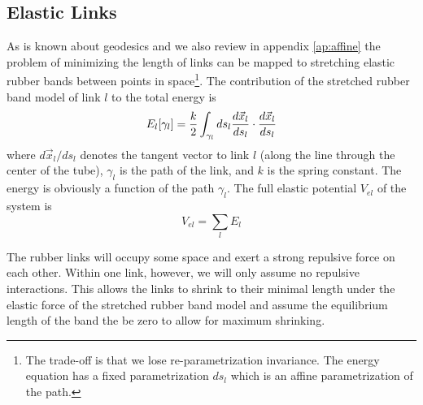 \documentclass[nofootinbib,preprint,floatfix,titlepage,superscriptaddress]{revtex4} %
\newcommand{\outNim}[1]{}
\begin{document}
\outNim{
\subsection{Other links}

We will implement the curved-space rubber-band similar to flat space. The repulsive force from other links is a function of their geodesic distance, but that is hard to calculate in curved space. Since we assume the force to be short-ranged, we will use a constant metric, based on the midpoint between the two points to calculate the distance between the two points and won't use accurate geodesic distance. 

Also, we will add this repulsive force directly as a force on the l.h.s. of the geodesic equation and won't try to incorporate it into the metric and derive perturbed Christoffel symbols. 
Thus we will only need to define a global metric function.  

}


\subsection{Elastic Links}
As is known about geodesics \citep{novikov1984} and we also review in appendix \ref{ap:affine} the problem of minimizing the length of links can be mapped to stretching elastic rubber bands between points in space\footnote{The trade-off is that we lose re-parametrization invariance. The energy equation has a fixed parametrization $ds_l$ which is an affine parametrization of the path.}. The contribution of the stretched rubber band model of link $l$ to the total energy is
\begin{equation}
  E_l[\gamma_l] = {k\over 2}\int_{\gamma_l} ds_l {d\vec{x}_l\over ds_l} \cdot {d\vec{x}_l\over ds_l} \label{eq:El}
\end{equation}
where $d\vec{x}_l/ds_l$ denotes the tangent vector to link $l$ (along the line through the center of the tube), $\gamma_l$ is the path of the link, and $k$ is the spring constant. 
The energy is obviously a function of the path $\gamma_l$. 
The full elastic potential $V_{el}$ of the system is
\begin{equation}
    V_{el} = \sum_l E_l
\end{equation}

The rubber links will occupy some space and exert a strong repulsive force on each other. Within one link, however, we will only assume no repulsive interactions. This allows the links to shrink to their minimal length under the elastic force of the stretched rubber band model and assume the equilibrium length of the band the be zero to allow for maximum shrinking. 
\end{document}
